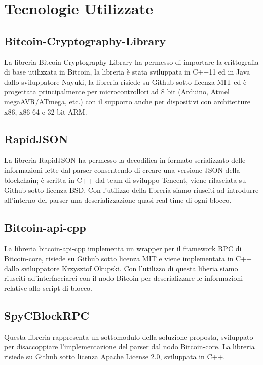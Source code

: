 \chapter{Tecnologie Utilizzate}\label{chap:tecnologieUtilizzate}

\section{Bitcoin-Cryptography-Library} \label{sec:cryptographyBitcoinLib}

La libreria Bitcoin-Cryptography-Library ha permesso di importare la crittografia di base utilizzata in Bitcoin, la libreria è stata sviluppata in C++11 ed in Java dallo sviluppatore Nayuki, la libreria risiede su Github sotto licenza MIT ed è progettata principalmente per microcontrollori ad 8 bit (Arduino, Atmel megaAVR/ATmega, etc.) con il supporto anche per dispositivi con architetture x86, x86-64 e 32-bit ARM.

\section{RapidJSON} \label{sec:rapidjsonLib}

La libreria RapidJSON ha permesso la decodifica in formato serializzato delle informazioni lette dal parser consentendo di creare una versione JSON della blockchain; è scritta in C++ dal team di sviluppo Tencent, viene rilasciata su Github sotto licenza BSD.
Con l’utilizzo della libreria siamo riusciti ad introdurre all’interno del parser una deserializzazione quasi real time di ogni blocco.


\section{Bitcoin-api-cpp} \label{sec:bitcoinApiLib}

La libreria bitcoin-api-cpp implementa un wrapper per il framework RPC di Bitcoin-core, risiede su Github sotto licenza MIT e viene implementata in C++ dallo sviluppatore Krzysztof Okupski.
Con l'utilizzo di questa liberia siamo riusciti ad'interfacciarci con il nodo Bitcoin per deserializzare le informazioni relative allo script di blocco.

\section{SpyCBlockRPC} \label{sec:spycblockrpcLib}

Questa libreria rappresenta un sottomodulo della soluzione proposta, sviluppato per disaccoppiare l'implementazione del parser dal nodo Bitcoin-core.
La libreria risiede su Github sotto licenza Apache License 2.0, sviluppata in C++.

